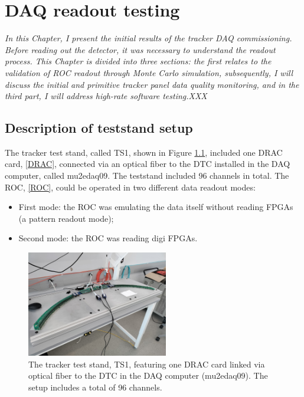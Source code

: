 \chapter{DAQ readout testing}
\textit{In this Chapter, I present the initial results of the tracker DAQ commissioning. Before reading out the detector, 
    it was necessary to understand the readout process. This Chapter is divided into three sections: the first relates 
    to the validation of ROC readout through Monte Carlo simulation, subsequently, I will discuss the initial and primitive tracker panel data quality monitoring, 
    and in the third part, I will address high-rate software testing.XXX}
    
  \section{Description of teststand setup}\label{des}
    The tracker test stand, called TS1, shown in Figure \ref{fig:TS1}, included one DRAC card, \ref{DRAC}, connected via an optical fiber
    to the DTC installed in the DAQ computer, called mu2edaq09. The teststand included 96 channels in total.
    The ROC, \ref{ROC}, could be operated in two different data readout modes:
    \begin{itemize}
    \item  First mode: the ROC was emulating the data itself without reading FPGAs (a pattern readout mode);
    \item  Second mode: the ROC was reading digi FPGAs.
    \end{itemize}
    \begin{figure}[!h]
        \centering
        \includegraphics[width =0.55\textwidth]{figures/jpg/IMG_20240219_090538.jpg}
        \caption{The tracker test stand, TS1, featuring one DRAC card linked via optical fiber to the DTC in the DAQ computer (mu2edaq09). The setup includes a total of 96 channels.}
        \label{fig:TS1}
        \end{figure}

